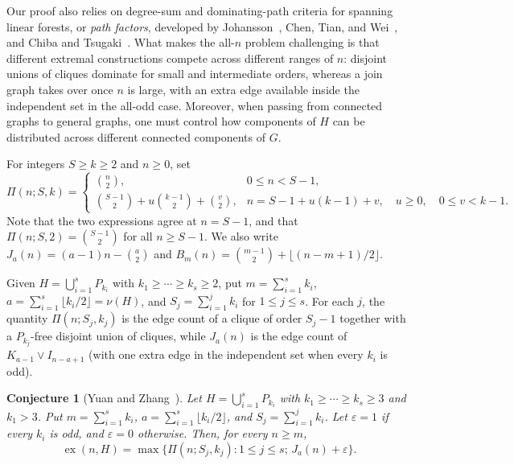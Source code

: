\documentclass[10pt]{article}
\theoremstyle{compactplain}
\newtheorem{conjecture}{Conjecture}[section]
\theoremstyle{remark}\newtheorem{remark}[theorem]{Remark}
\newcommand{\ex}{\operatorname{ex}}
\begin{document}
Our proof also relies on degree-sum and dominating-path criteria for
spanning linear forests, or \emph{path factors}, developed by
Johansson~\cite{Johansson}, Chen, Tian, and Wei~\cite{CTW}, and Chiba and
Tsugaki~\cite{ChibaTsugaki}. What makes the all-$n$ problem challenging
is that different extremal constructions compete across different ranges
of $n$: disjoint unions of cliques dominate for small and intermediate
orders, whereas a join graph takes over once $n$ is large, with an extra
edge available inside the independent set in the all-odd case. Moreover,
when passing from connected graphs to general graphs, one must control
how components of $H$ can be distributed across different connected
components of $G$.

For integers $S\ge k\ge2$ and $n\ge0$, set
\begin{equation}\label{eq:prefix}
 \Pi(n;S,k)=
 \begin{cases}
  \binom{n}{2}, & 0\le n<S-1,\\[2pt]
  \displaystyle\binom{S-1}{2}+u\binom{k-1}{2}+\binom{v}{2},
   & n=S-1+u(k-1)+v,\quad u\ge0,\quad 0\le v<k-1.
 \end{cases}
\end{equation}
Note that the two expressions agree at $n=S-1$, and that
$\Pi(n;S,2)=\binom{S-1}{2}$ for all $n\ge S-1$. We also write
$J_a(n)=(a-1)n-\binom{a}{2}$ and
$B_m(n)=\binom{m-1}{2}+\lfloor(n-m+1)/2\rfloor$.

Given $H=\bigcup_{i=1}^s P_{k_i}$ with $k_1\ge\cdots\ge k_s\ge2$, put
$m=\sum_{i=1}^s k_i$, $a=\sum_{i=1}^s\lfloor k_i/2\rfloor=\nu(H)$, and
$S_j=\sum_{i=1}^j k_i$ for $1\le j\le s$. For each $j$, the quantity
$\Pi(n;S_j,k_j)$ is the edge count of a clique of order $S_j-1$ together
with a $P_{k_j}$-free disjoint union of cliques, while $J_a(n)$ is the
edge count of $K_{a-1}\vee I_{n-a+1}$ (with one extra edge in the
independent set when every $k_i$ is odd).

\begin{conjecture}[Yuan and Zhang~\cite{YZ}]
Let $H=\bigcup_{i=1}^s P_{k_i}$ with $k_1\ge\cdots\ge k_s\ge3$ and
$k_1>3$. Put $m=\sum_{i=1}^s k_i$,
$a=\sum_{i=1}^s\lfloor k_i/2\rfloor$, and $S_j=\sum_{i=1}^j k_i$. Let
$\varepsilon=1$ if every $k_i$ is odd, and $\varepsilon=0$ otherwise.
Then, for every $n\ge m$,
\begin{equation}\label{eq:formula}
 \ex(n,H)=\max\bigl\{\Pi(n;S_j,k_j):1\le j\le s;\,
 J_a(n)+\varepsilon\bigr\}.
\end{equation}
\end{conjecture}
\end{document}
